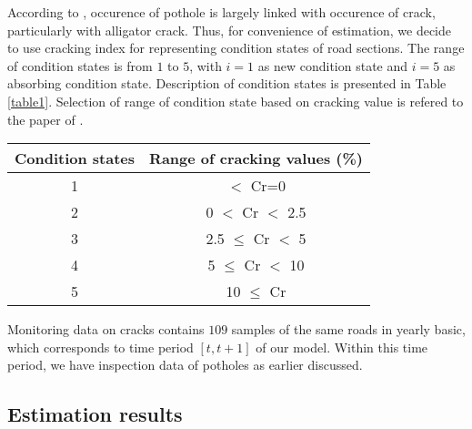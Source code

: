 \documentclass[a4paper,oneside,onecolumn,preprint,10pt,authoryear]{elsarticle}
\begin{document}
According to \citet{Okizukakaito09}, occurence of pothole is largely linked with occurence of crack, particularly with alligator crack. Thus, for convenience of estimation, we decide to use cracking index for representing condition states of road sections. The range of condition states is from $1$ to $5$, with $i=1$ as new condition state and $i=5$ as absorbing condition state. Description of condition states is presented in Table \ref{table1}. Selection of range of condition state based on cracking value is refered to the paper of \citet{kumadakoba}.
%
\begin{table*}
\caption{Description of condition state.}
\label{table1}
{\small
\begin{center}
\begin{tabular}{c|c}\hline
Condition states & Range of cracking values (\%)\\\hline
1 & $<$  Cr=0 \\
2 & 0 $<$ Cr $<$ 2.5 \\
3 & 2.5 $\leq$ Cr $<$ 5 \\
4 & 5 $\leq$ Cr $<$ 10 \\
5 & 10 $\leq$ Cr  \\\hline
\end{tabular}
\end{center}
}
\end{table*}

Monitoring data on cracks contains $109$ samples of the same roads in yearly basic, which corresponds to time period $[t,t+1]$ of our model. Within this time period, we have inspection data of potholes as earlier discussed. 
\subsection{Estimation results}
\label{sec62}
\end{document}
